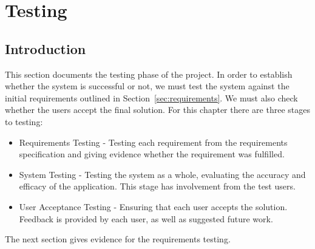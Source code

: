 \chapter{Testing}
\label{ch:testing}
\section{Introduction}
This section documents the testing phase of the project. In order to establish whether the system is successful or not, we must test the system against the initial requirements outlined in Section~\ref{sec:requirements}. We must also check whether the users accept the final solution. For this chapter there are three stages to testing:

\begin{itemize}
	\item Requirements Testing - Testing each requirement from the requirements specification and giving evidence whether the requirement was fulfilled.
	\item System Testing - Testing the system as a whole, evaluating the accuracy and efficacy of the application. This stage has involvement from the test users.
	\item User Acceptance Testing - Ensuring that each user accepts the solution. Feedback is provided by each user, as well as suggested future work.
\end{itemize}

The next section gives evidence for the requirements testing.

\newpage

